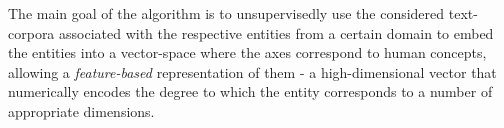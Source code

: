 The main goal of the algorithm is to unsupervisedly use the considered text-corpora associated with the respective entities from a certain domain %
to embed the entities into a vector-space where the axes correspond to human concepts, %
allowing a \textit{feature-based} representation of them - a high-dimensional vector that numerically encodes the degree %
to which the entity corresponds to a number of appropriate dimensions. %
\newline

